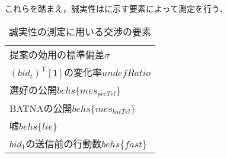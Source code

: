 これらを踏まえ，誠実性はに示す要素によって測定を行う．

\begin{table}[b]
    \centering
    \caption{誠実性の測定に用いる交渉の要素}
    \begin{tabular}{l} \toprule
        提案の効用の標準偏差$\sigma$ \\
        $(bid_t)^{\mathrm{T}}[1]$の変化率$undefRatio$  \\
        選好の公開$behs\{mes_{\mathit{preTel}}\}$ \\
        BATNAの公開$behs\{mes_{\mathit{batTel}}\}$ \\
        嘘$behs\{lie\}$ \\ 
        $bid_1$の送信前の行動数$behs\{fast\}$ \\ \bottomrule
    \end{tabular}
    \label{tab:conscientiousness}
\end{table}

